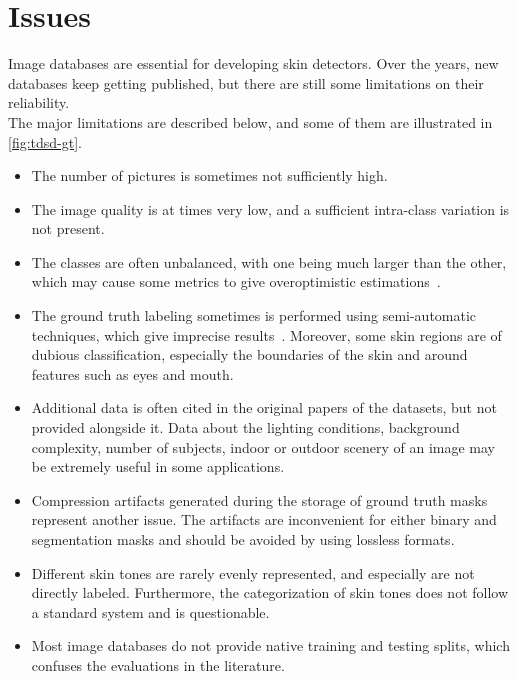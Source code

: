 \section{Issues}

Image databases are essential for developing skin detectors.
Over the years, new databases keep getting published, but there are still some limitations on their reliability.\\
The major limitations are described below, and some of them are illustrated in \autoref{fig:tdsd-gt}.

\begin{itemize}
    \item The number of pictures is sometimes not sufficiently high.
    \item The image quality is at times very low, and a sufficient intra-class variation is not present.
    \item The classes are often unbalanced, with one being much larger than the other, which may cause some metrics to give overoptimistic estimations~\cite{chicco2020advantages}.
    \item The ground truth labeling sometimes is performed using semi-automatic techniques, which give imprecise results~\cite{mahmoodi2015sdd}.
    Moreover, some skin regions are of dubious classification, especially the boundaries of the skin and around features such as eyes and mouth.
    \item Additional data is often cited in the original papers of the datasets, but not provided alongside it. Data about the lighting conditions, background complexity, number of subjects, indoor or outdoor scenery of an image may be extremely useful in some applications.
    \item Compression artifacts generated during the storage of ground truth masks represent another issue. The artifacts are inconvenient for either binary and segmentation masks and should be avoided by using lossless formats.
    \item Different skin tones are rarely evenly represented, and especially are not directly labeled.
    Furthermore, the categorization of skin tones does not follow a standard system and is questionable.
    \item Most image databases do not provide native training and testing splits, which confuses the evaluations in the literature.
\end{itemize}

